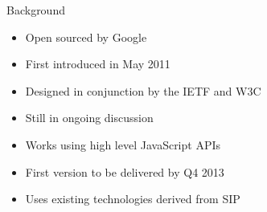 \documentclass[first=red,second=purple,logo=yellowexc]{aaltoslides}
\begin{document}
\begin{frame}{Background}

\begin{itemize}
\item Open sourced by Google
\item First introduced in May 2011
\item Designed in conjunction by the IETF and W3C
\item Still in ongoing discussion
\item Works using high level JavaScript APIs 
\item First version to be delivered by Q4 2013
\item Uses existing technologies derived from SIP
\end{itemize}
\end{frame}

\end{document}
